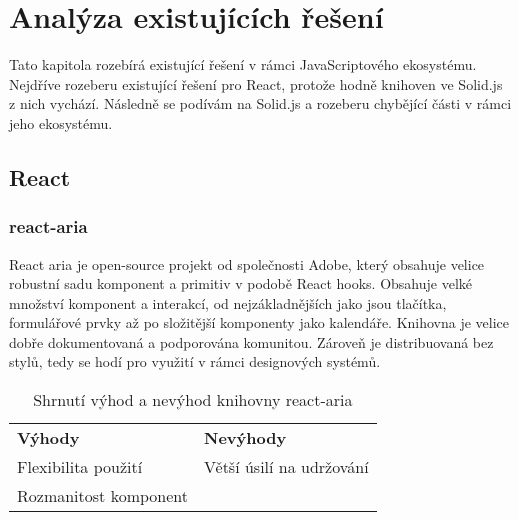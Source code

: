 \chapter{Analýza existujících řešení}

Tato kapitola rozebírá existující řešení v rámci JavaScriptového ekosystému.
Nejdříve rozeberu existující řešení pro React, protože hodně knihoven ve Solid.js z nich vychází.
Následně se podívám na Solid.js a rozeberu chybějící části v rámci jeho ekosystému.

\section{React}

\subsection{react-aria}

React aria je open-source projekt od společnosti Adobe, který obsahuje velice robustní sadu komponent a primitiv v podobě React hooks.
Obsahuje velké množství komponent a interakcí, od nejzákladnějších jako jsou tlačítka, formulářové prvky až po složitější komponenty jako kalendáře.
Knihovna je velice dobře dokumentovaná a podporována komunitou.
Zároveň je distribuovaná bez stylů, tedy se hodí pro využití v rámci designových systémů.

\begin{table}[ht]
    \begin{ctucolortab}
        \begin{tabularx}{\textwidth}{Y Y}
            \bfseries \textcolor{OK}{Výhody} & \bfseries \textcolor{NOT_OK}{Nevýhody} \\\Midrule{}
            Flexibilita použití              & Větší úsilí na udržování               \\
            Rozmanitost komponent
        \end{tabularx}
    \end{ctucolortab}
    \caption{Shrnutí výhod a nevýhod knihovny react-aria}
\end{table}




